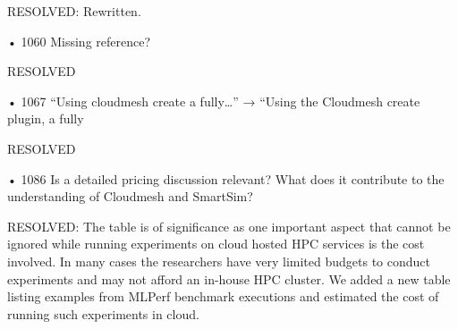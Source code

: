     RESOLVED: Rewritten.
    
• 1060 Missing reference?

    RESOLVED
    
• 1067 “Using cloudmesh create a fully…” → “Using the Cloudmesh create plugin, a
fully

    RESOLVED
    
• 1086 Is a detailed pricing discussion relevant? What does it contribute to the
understanding of Cloudmesh and SmartSim?

    RESOLVED: The table is of significance as one important aspect that cannot be ignored while running experiments on cloud hosted HPC services is the cost involved. In many cases the researchers have very limited budgets to conduct experiments and may not afford an in-house HPC cluster. 
    We added a new table listing examples from MLPerf benchmark executions and estimated the cost of running such experiments in cloud.
